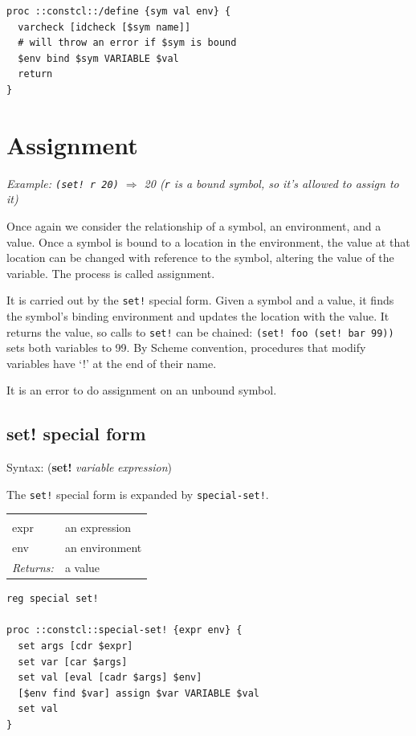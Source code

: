 \documentclass[twoside]{report}
\begin{document}
\begin{lstlisting}
proc ::constcl::/define {sym val env} {
  varcheck [idcheck [$sym name]]
  # will throw an error if $sym is bound
  $env bind $sym VARIABLE $val
  return
}
\end{lstlisting}

\section{Assignment}
\label{assignment}

\emph{Example: \texttt{(set! r 20)} $\Rightarrow$ 20 (\texttt{r} is a bound symbol, so it's allowed to assign to it)}

Once again we consider the relationship of a symbol, an environment, and a value. Once a symbol is bound to a location in the environment, the value at that location can be changed with reference to the symbol, altering the value of the variable. The process is called assignment.

It is carried out by the \texttt{set!} special form. Given a symbol and a value, it finds the symbol's binding environment and updates the location with the value. It returns the value, so calls to \texttt{set!} can be chained: \texttt{(set! foo (set! bar 99))} sets both variables to 99. By Scheme convention, procedures that modify variables have `!' at the end of their name.

It is an error to do assignment on an unbound symbol.

\subsection{set! special form}
\label{set-special-form}

Syntax: (\textbf{set!} \emph{variable} \emph{expression})

The \texttt{set!} special form is expanded by \texttt{special-set!}.

\noindent\begin{tabular}{ |p{1.9cm} p{8cm}| }
\hline
\rowcolor[HTML]{CCCCCC} \multicolumn{2}{|l|}{\bf special-set! (internal)} \\
expr & an expression \\
env & an environment \\
\textit{Returns:} & a value \\
\hline
\end{tabular}

\begin{lstlisting}
reg special set!

proc ::constcl::special-set! {expr env} {
  set args [cdr $expr]
  set var [car $args]
  set val [eval [cadr $args] $env]
  [$env find $var] assign $var VARIABLE $val
  set val
}
\end{lstlisting}
\end{document}
